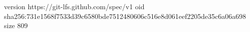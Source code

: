 version https://git-lfs.github.com/spec/v1
oid sha256:731e1568f7533d39c6580bde7512480606c516e8d061eef2205de35c6a06a698
size 809

